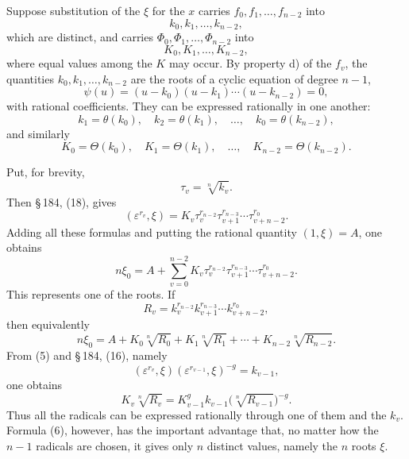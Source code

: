 \documentclass[11pt]{article}
\begin{document}
Suppose substitution of the $\xi$ for the $x$ carries $f_0,f_1,\ldots,f_{n-2}$ into
\[
  k_0,k_1,\ldots,k_{n-2},
\]
which are distinct, and carries $\Phi_0,\Phi_1,\ldots,\Phi_{n-2}$ into
\[
  K_0,K_1,\ldots,K_{n-2},
\]
where equal values among the $K$ may occur. By property d) of the $f_v$, the quantities $k_0,k_1,\ldots,k_{n-2}$ are the roots of a cyclic equation of degree $n-1$,
\begin{equation}\tag{1}
  \psi(u)=(u-k_0)(u-k_1)\cdots(u-k_{n-2})=0,
\end{equation}
with rational coefficients. They can be expressed rationally in one another:
\begin{equation}\tag{2}
  k_1=\theta(k_0),\quad k_2=\theta(k_1),\quad\ldots,\quad k_0=\theta(k_{n-2}),
\end{equation}
and similarly
\begin{equation}\tag{3}
  K_0=\Theta(k_0),\quad K_1=\Theta(k_1),\quad\ldots,\quad K_{n-2}=\Theta(k_{n-2}).
\end{equation}

Put, for brevity,
\begin{equation}\tag{4}
  \tau_v=\sqrt[n]{k_v}.
\end{equation}
Then \S\,184, (18), gives
\begin{equation}\tag{5}
  (\varepsilon^{r_v},\xi)=K_v\tau_v^{r_{n-2}}\tau_{v+1}^{r_{n-3}}\cdots\tau_{v+n-2}^{r_0}.
\end{equation}
Adding all these formulas and putting the rational quantity $(1,\xi)=A$, one obtains
\begin{equation}\tag{6}
  n\xi_0=A+\sum_{v=0}^{n-2}K_v\tau_v^{r_{n-2}}\tau_{v+1}^{r_{n-3}}\cdots\tau_{v+n-2}^{r_0}.
\end{equation}
This represents one of the roots. If
\[
  R_v=k_v^{r_{n-2}}k_{v+1}^{r_{n-3}}\cdots k_{v+n-2}^{r_0},
\]
then equivalently
\begin{equation}\tag{7}
  n\xi_0=A+K_0\sqrt[n]{R_0}+K_1\sqrt[n]{R_1}+\cdots+K_{n-2}\sqrt[n]{R_{n-2}}.
\end{equation}
From (5) and \S\,184, (16), namely
\[
  (\varepsilon^{r_v},\xi)(\varepsilon^{r_{v-1}},\xi)^{-g}=k_{v-1},
\]
one obtains
\begin{equation}\tag{8}
  K_v\sqrt[n]{R_v}=K_{v-1}^{g} k_{v-1}\bigl(\sqrt[n]{R_{v-1}}\bigr)^{-g}.
\end{equation}
Thus all the radicals can be expressed rationally through one of them and the $k_v$. Formula (6), however, has the important advantage that, no matter how the $n-1$ radicals are chosen, it gives only $n$ distinct values, namely the $n$ roots $\xi$.
\end{document}
